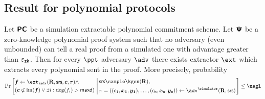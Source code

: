 \documentclass[runningheads,11pt]{llncs}
\begin{document}
\subsection{Result for polynomial protocols}
\begin{lemma}
  Let $\bm{\mathsf{PC}}$ be a simulation extractable polynomial commitment scheme. Let
  $\bm{\mathsf{\Psi}}$ be a zero-knowledge polynomial proof system such that no adversary (even
  unbounded) can tell a real proof from a simulated one with advantage greater
  than $\varepsilon_{\mathsf{zk}}$. Then for every $\ppt$ adversary $\adv$ there exists extractor
  $\ext$ which extracts every polynomial sent in the proof. More precisely,
  probability
  \[
    \Pr\left[
      \begin{aligned}
        & \vec{f} \gets \ext_\adv(\REL, \srs, \vec{c}, \zkproof) \land \\
        & (\vec{c} \not\in \image(\vec{f}) \lor \exists i: \deg(f_i) > \maxdeg)
        \end{aligned}
      \, \left| \,
        \begin{aligned}
          & \srs \sample \kgen(\REL), \\
          & \zkproof = ((c_1, \vec{x_1}, \vec{y_{1}}), \ldots, (c_\plen,
          \vec{x}_\plen, \vec{y}_{\plen})) \gets \adv^{\simulator}(\REL, \srs)
        \end{aligned}
        \right.
    \right] \leq \negl
  \]
\end{lemma}
\end{document}
